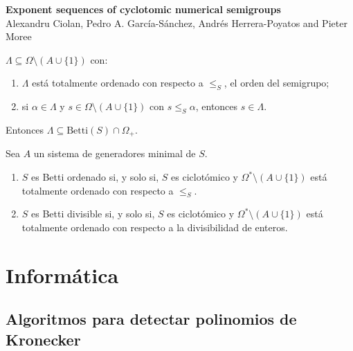 \documentclass[10pt,compress]{beamer}
\begin{document}
\begin{frame}
  \begin{tcolorbox}[colback=ChetwodeBlue!10,colframe=ChetwodeBlue!60]
    \begin{center}
      \vspace*{-1mm} {\color{TurkishRose}\textbf{Exponent sequences of cyclotomic numerical semigroups}} \\
      Alexandru Ciolan, Pedro A. Garc\'ia-Sánchez, Andrés Herrera-Poyatos and Pieter Moree
    \end{center}
    \vspace*{-4mm}
  \end{tcolorbox}

  \begin{theorem} 
    $\Lambda \subseteq \Omega \setminus (A \cup \{1\})$ con:
    \begin{enumerate}
    \item $\Lambda$ está totalmente ordenado con respecto a $\le_S$, el orden del semigrupo;
    \item si $\alpha \in \Lambda$ y $s \in \Omega \setminus (A \cup \{1\})$ con $s \le_S \alpha$,
      entonces $s \in \Lambda$.
    \end{enumerate}
    Entonces $\Lambda \subseteq \mathrm{Betti}(S) \cap \Omega_+$.
  \end{theorem}

  \begin{theorem}
    Sea $A$ un sistema de generadores minimal de $S$.
    \begin{enumerate}
    \item $S$ es Betti ordenado si, y solo si, $S$ es ciclotómico y $\Omega^* \setminus (A \cup \{1\})$ está totalmente
      ordenado con respecto a $\le_S$.
    \item $S$ es Betti divisible si, y solo si, $S$ es ciclotómico y $\Omega^{*} \setminus (A \cup \{1\})$ está totalmente
      ordenado con respecto a la divisibilidad de enteros.
    \end{enumerate}
  \end{theorem}  
\end{frame}

\section{Informática}

\subsection{Algoritmos para detectar polinomios de Kronecker}
\end{document}
